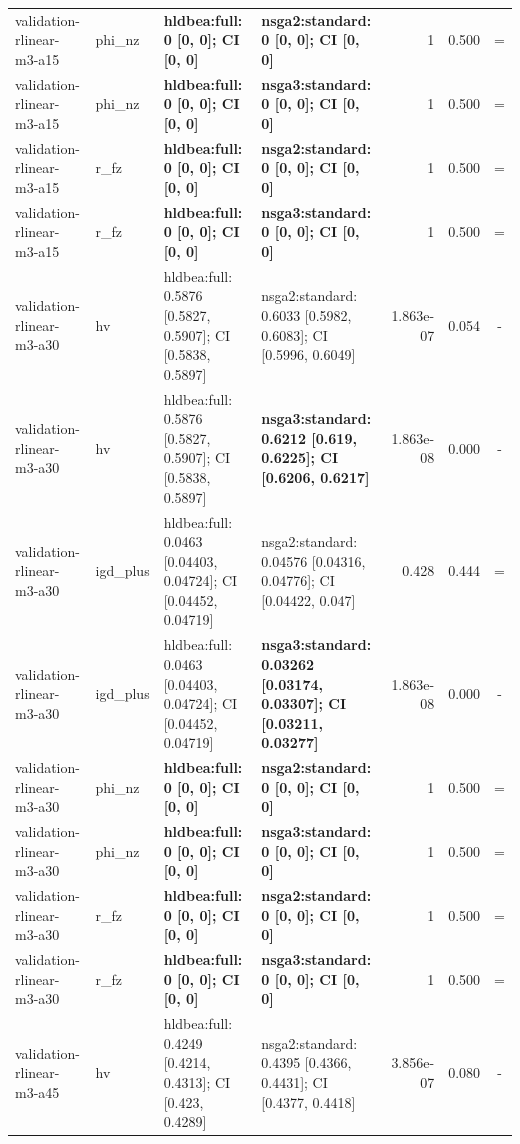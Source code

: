 \begin{tabular}{llllrrc}
validation-rlinear-m3-a15 & phi\_nz & \textbf{hldbea:full: 0 [0, 0]; CI [0, 0]} & \textbf{nsga2:standard: 0 [0, 0]; CI [0, 0]} & 1 & 0.500 & = \\
validation-rlinear-m3-a15 & phi\_nz & \textbf{hldbea:full: 0 [0, 0]; CI [0, 0]} & \textbf{nsga3:standard: 0 [0, 0]; CI [0, 0]} & 1 & 0.500 & = \\
validation-rlinear-m3-a15 & r\_fz & \textbf{hldbea:full: 0 [0, 0]; CI [0, 0]} & \textbf{nsga2:standard: 0 [0, 0]; CI [0, 0]} & 1 & 0.500 & = \\
validation-rlinear-m3-a15 & r\_fz & \textbf{hldbea:full: 0 [0, 0]; CI [0, 0]} & \textbf{nsga3:standard: 0 [0, 0]; CI [0, 0]} & 1 & 0.500 & = \\
validation-rlinear-m3-a30 & hv & hldbea:full: 0.5876 [0.5827, 0.5907]; CI [0.5838, 0.5897] & nsga2:standard: 0.6033 [0.5982, 0.6083]; CI [0.5996, 0.6049] & 1.863e-07 & 0.054 & - \\
validation-rlinear-m3-a30 & hv & hldbea:full: 0.5876 [0.5827, 0.5907]; CI [0.5838, 0.5897] & \textbf{nsga3:standard: 0.6212 [0.619, 0.6225]; CI [0.6206, 0.6217]} & 1.863e-08 & 0.000 & - \\
validation-rlinear-m3-a30 & igd\_plus & hldbea:full: 0.0463 [0.04403, 0.04724]; CI [0.04452, 0.04719] & nsga2:standard: 0.04576 [0.04316, 0.04776]; CI [0.04422, 0.047] & 0.428 & 0.444 & = \\
validation-rlinear-m3-a30 & igd\_plus & hldbea:full: 0.0463 [0.04403, 0.04724]; CI [0.04452, 0.04719] & \textbf{nsga3:standard: 0.03262 [0.03174, 0.03307]; CI [0.03211, 0.03277]} & 1.863e-08 & 0.000 & - \\
validation-rlinear-m3-a30 & phi\_nz & \textbf{hldbea:full: 0 [0, 0]; CI [0, 0]} & \textbf{nsga2:standard: 0 [0, 0]; CI [0, 0]} & 1 & 0.500 & = \\
validation-rlinear-m3-a30 & phi\_nz & \textbf{hldbea:full: 0 [0, 0]; CI [0, 0]} & \textbf{nsga3:standard: 0 [0, 0]; CI [0, 0]} & 1 & 0.500 & = \\
validation-rlinear-m3-a30 & r\_fz & \textbf{hldbea:full: 0 [0, 0]; CI [0, 0]} & \textbf{nsga2:standard: 0 [0, 0]; CI [0, 0]} & 1 & 0.500 & = \\
validation-rlinear-m3-a30 & r\_fz & \textbf{hldbea:full: 0 [0, 0]; CI [0, 0]} & \textbf{nsga3:standard: 0 [0, 0]; CI [0, 0]} & 1 & 0.500 & = \\
validation-rlinear-m3-a45 & hv & hldbea:full: 0.4249 [0.4214, 0.4313]; CI [0.423, 0.4289] & nsga2:standard: 0.4395 [0.4366, 0.4431]; CI [0.4377, 0.4418] & 3.856e-07 & 0.080 & - \\

\end{tabular}
